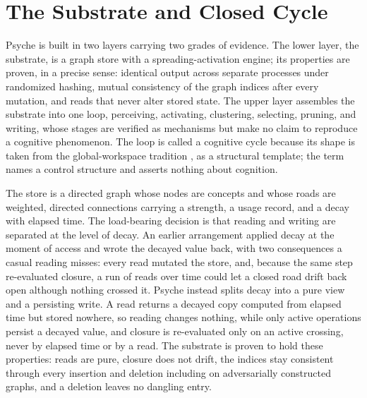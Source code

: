 \documentclass[conference]{IEEEtran}
\begin{document}
\section{The Substrate and Closed Cycle}\label{sec:substrate}
Psyche is built in two layers carrying two grades of evidence. The lower layer, the
substrate, is a graph store with a spreading-activation engine; its properties are
proven, in a precise sense: identical output across separate processes under randomized
hashing, mutual consistency of the graph indices after every mutation, and reads that
never alter stored state. The upper layer assembles the substrate into one loop,
perceiving, activating, clustering, selecting, pruning, and writing, whose stages are
verified as mechanisms but make no claim to reproduce a cognitive phenomenon. The loop is
called a cognitive cycle because its shape is taken from the global-workspace tradition
\cite{baars1988cognitive, franklin2014lida}, as a structural template; the term names a
control structure and asserts nothing about cognition.

The store is a directed graph whose nodes are concepts and whose roads are weighted,
directed connections carrying a strength, a usage record, and a decay with elapsed time.
The load-bearing decision is that reading and writing are separated at the level of decay.
An earlier arrangement applied decay at the moment of access and wrote the decayed value
back, with two consequences a casual reading misses: every read mutated the store, and,
because the same step re-evaluated closure, a run of reads over time could let a closed
road drift back open although nothing crossed it. Psyche instead splits decay into a pure
view and a persisting write. A read returns a decayed copy computed from elapsed time but
stored nowhere, so reading changes nothing, while only active operations persist a decayed
value, and closure is re-evaluated only on an active crossing, never by elapsed time or by
a read. The substrate is proven to hold these properties: reads are pure, closure does not
drift, the indices stay consistent through every insertion and deletion including on
adversarially constructed graphs, and a deletion leaves no dangling entry.
\end{document}
